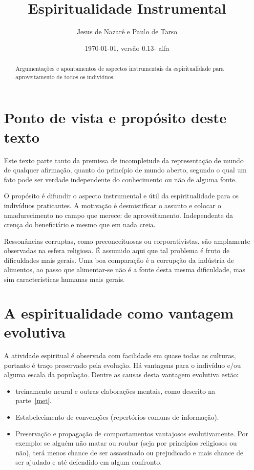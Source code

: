 \documentclass[a4paper]{article}
\title{Espiritualidade Instrumental}
\author{Jesus de Nazaré e Paulo de Tarso}
\date{\today, versão 0.13- alfa}
\begin{document}
\maketitle



\begin{abstract}
Argumentações e apontamentos de aspectos instrumentais da espiritualidade para aproveitamento de todos os indivíduos.
\end{abstract}

\tableofcontents

\section{Ponto de vista e propósito deste texto}
Este texto parte tanto da premissa de incompletude da representação de mundo de qualquer afirmação, quanto do princípio de mundo aberto, segundo o qual um fato pode ser verdade independente do conhecimento ou não de alguma fonte.

O propósito é difundir o aspecto instrumental e útil da espiritualidade para os indivíduos praticantes. A motivação é desmistificar o assunto e colocar o amadurecimento no campo que merece: de aproveitamento. Independente da crença do beneficiário e mesmo que em nada creia.

Ressonâncias corruptas, como preconceituosas ou corporativistas, são amplamente observadas na esfera religiosa. É assumido aqui que tal problema é fruto de
dificuldades mais gerais. Uma boa comparação é a corrupção
da indústria de alimentos, ao passo que alimentar-se não é a fonte desta mesma dificuldade, mas sim características humanas mais gerais.

\section{A espiritualidade como vantagem evolutiva}
A atividade espiritual é observada com facilidade em quase todas as culturas, portanto é traço preservado pela evolução. Há vantagens para o indivíduo e/ou alguma escala da população. Dentre as causas desta vantagem evolutiva estão:
\begin{itemize}
    \item treinamento neural e outras elaborações mentais, como descrito na parte~\ref{met}.
    \item Estabelecimento de convenções (repertórios comuns de informação).
    \item Preservação e propagação de comportamentos vantajosos evolutivamente. Por exemplo: se alguém não matar ou roubar (seja por princípios religiosos ou não), terá menos chance de ser assassinado ou prejudicado e mais chance de ser ajudado e até defendido em algum confronto.
\end{itemize}
\end{document}
